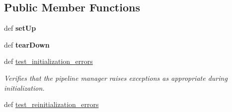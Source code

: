 \subsection*{Public Member Functions}
\begin{DoxyCompactItemize}
\item 
\hypertarget{classhwm_1_1hardware_1_1pipelines_1_1tests_1_1test__pipeline__manager_1_1_test_pipeline_manager_ac179d43830017f0a99bf9712f7cbee81}{def {\bfseries set\-Up}}\label{classhwm_1_1hardware_1_1pipelines_1_1tests_1_1test__pipeline__manager_1_1_test_pipeline_manager_ac179d43830017f0a99bf9712f7cbee81}

\item 
\hypertarget{classhwm_1_1hardware_1_1pipelines_1_1tests_1_1test__pipeline__manager_1_1_test_pipeline_manager_a72737439c025f32b64a8d67987736046}{def {\bfseries tear\-Down}}\label{classhwm_1_1hardware_1_1pipelines_1_1tests_1_1test__pipeline__manager_1_1_test_pipeline_manager_a72737439c025f32b64a8d67987736046}

\item 
\hypertarget{classhwm_1_1hardware_1_1pipelines_1_1tests_1_1test__pipeline__manager_1_1_test_pipeline_manager_a7b4162cdcb61eaf8e7991d13b2432897}{def \hyperlink{classhwm_1_1hardware_1_1pipelines_1_1tests_1_1test__pipeline__manager_1_1_test_pipeline_manager_a7b4162cdcb61eaf8e7991d13b2432897}{test\-\_\-initialization\-\_\-errors}}\label{classhwm_1_1hardware_1_1pipelines_1_1tests_1_1test__pipeline__manager_1_1_test_pipeline_manager_a7b4162cdcb61eaf8e7991d13b2432897}

\begin{DoxyCompactList}\small\item\em Verifies that the pipeline manager raises exceptions as appropriate during initialization. \end{DoxyCompactList}\item 
\hypertarget{classhwm_1_1hardware_1_1pipelines_1_1tests_1_1test__pipeline__manager_1_1_test_pipeline_manager_a563c7b5996e4339a1413bf079df4984a}{def \hyperlink{classhwm_1_1hardware_1_1pipelines_1_1tests_1_1test__pipeline__manager_1_1_test_pipeline_manager_a563c7b5996e4339a1413bf079df4984a}{test\-\_\-reinitialization\-\_\-errors}}\label{classhwm_1_1hardware_1_1pipelines_1_1tests_1_1test__pipeline__manager_1_1_test_pipeline_manager_a563c7b5996e4339a1413bf079df4984a}


\end{DoxyCompactItemize}
